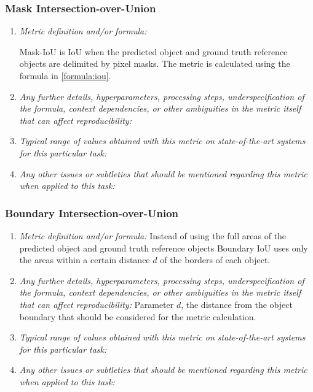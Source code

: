 \documentclass[a4paper,11pt]{article}
\begin{document}
        \subsubsection{Mask Intersection-over-Union}
            \begin{enumerate}[label=\alph*.]
                \item \textit{Metric definition and/or formula:}

                Mask-IoU is IoU when the predicted object and ground truth reference objects are delimited by pixel masks. The metric is calculated using the formula in \ref{formula:iou}.
                \bigskip
                \item \textit{Any further details, hyperparameters, processing steps, underspecification of the formula, context dependencies, or other ambiguities in the metric itself that can affect reproducibility:}
                \bigskip
                \item \textit{Typical range of values obtained with this metric on state-of-the-art systems for this particular task:}
                \bigskip
                \item \textit{Any other issues or subtleties that should be mentioned regarding this metric when applied to this task:}
                \bigskip
            \end{enumerate}

        \subsubsection{Boundary Intersection-over-Union}
            \begin{enumerate}[label=\alph*.]
                \item \textit{Metric definition and/or formula:}
                Instead of using the full areas of the predicted object and ground truth reference objects Boundary IoU uses only the areas within a certain distance $d$ of the borders of each object.
                \bigskip
                \item \textit{Any further details, hyperparameters, processing steps, underspecification of the formula, context dependencies, or other ambiguities in the metric itself that can affect reproducibility:}
                Parameter $d$, the distance from the object boundary that should be considered for the metric calculation.
                \bigskip
                \item \textit{Typical range of values obtained with this metric on state-of-the-art systems for this particular task:}
                \bigskip
                \item \textit{Any other issues or subtleties that should be mentioned regarding this metric when applied to this task:}
                \bigskip
            \end{enumerate}
\end{document}
